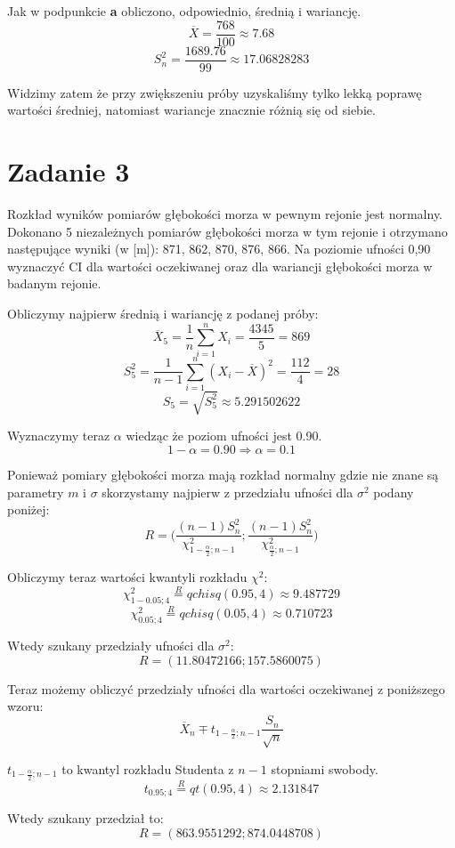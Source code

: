 \documentclass{article}
\begin{document}
Jak w podpunkcie \textbf{a} obliczono, odpowiednio, średnią i wariancję.
\[ \overline{X} = \frac{768}{100} \approx 7.68 \]
\[ S^2_n = \frac{1689.76}{99} \approx 17.06828283 \]

Widzimy zatem że przy zwiększeniu próby uzyskaliśmy tylko lekką poprawę wartości średniej, natomiast wariancje znacznie różnią się od siebie.

\newpage
\section{Zadanie 3}
Rozkład wyników pomiarów głębokości morza w pewnym rejonie jest normalny. Dokonano 5 niezależnych pomiarów głębokości morza w tym rejonie i otrzymano następujące wyniki (w [m]): 871, 862, 870, 876, 866. Na poziomie ufności 0,90 wyznaczyć CI dla wartości oczekiwanej oraz dla wariancji głębokości morza w badanym rejonie. \\ \par

Obliczymy najpierw średnią i wariancję z podanej próby:
\[ \overline{X}_5 = \frac{1}{n}\sum_{i=1}^n X_i = \frac{4345}{5} = 869 \]
\[ S^2_5 = \frac{1}{n-1}\sum_{i=1}^n (X_i-\overline{X})^2 = \frac{112}{4} = 28 \]
\[ S_5 = \sqrt{S_5^2} \approx 5.291502622 \]

Wyznaczymy teraz $\alpha$ wiedząc że poziom ufności jest 0.90.
\[1-\alpha = 0.90 \Rightarrow \alpha = 0.1 \]

Ponieważ pomiary głębokości morza mają rozkład normalny gdzie nie znane są parametry $m$ i $\sigma$ skorzystamy najpierw z przedziału ufności dla $\sigma^2$ podany poniżej:
\[R = \Big( \frac{(n-1)S_n^2}{\chi_{1-\frac{\alpha}{2}; n-1}^2} ; \frac{(n-1)S_n^2}{\chi_{\frac{\alpha}{2}; n-1}^2} \Big) \]

Obliczymy teraz wartości kwantyli rozkładu $\chi^2$:
\[ \chi_{1-0.05; 4}^2 \overset{R}{=} qchisq(0.95, 4) \approx 9.487729 \]
\[ \chi_{0.05; 4}^2 \overset{R}{=} qchisq(0.05, 4) \approx 0.710723 \]

Wtedy szukany przedziały ufności dla $\sigma^2$:
\[R = (11.80472166; 157.5860075) \]

Teraz możemy obliczyć przedziały ufności dla wartości oczekiwanej z poniższego wzoru:
\[ \overline{X}_n \mp t_{1-\frac{\alpha}{2};n-1} \frac{S_n}{\sqrt{n}} \]

$t_{1-\frac{\alpha}{2};n-1}$ to kwantyl rozkładu Studenta z $n-1$ stopniami swobody.
\[ t_{0.95;4} \overset{R}{=} qt(0.95,4) \approx 2.131847 \]

Wtedy szukany przedział to:
\[R = (863.9551292; 874.0448708) \] 
\end{document}
